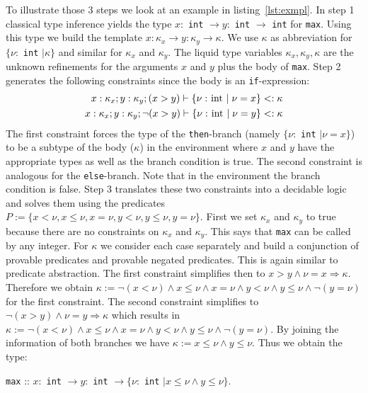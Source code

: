 \documentclass[a4paper,UKenglish]{lipics-v2016}
\begin{document}
To illustrate those 3 steps we look at an example in listing~\ref{lst:exmpl}.
In step 1 classical type inference yields the type $x:$ \lstinline{int} $\rightarrow y:$ \lstinline{int} $\rightarrow$ \lstinline{int} for \lstinline{max}.
Using this type we build the template $x: \kappa_x \rightarrow y: \kappa_y \rightarrow \kappa$.
We use $\kappa$ as abbreviation for $\{ \nu:$ \lstinline{int} $\mid \kappa\}$ and similar for $\kappa_x$ and $\kappa_y$.
The liquid type variables $\kappa_x, \kappa_y, \kappa$ are the unknown refinements for the arguments $x$ and $y$ plus the body of \lstinline{max}.
Step 2 generates the following constraints since the body is an \lstinline{if}-expression:
\begin{align}
    \label{algn:max}
    x: \kappa_x; y: \kappa_y; (x > y) \vdash \{\nu: \text{\lstinline|int|} \mid \nu = x \} <: \kappa\\
    x: \kappa_x; y: \kappa_y; \neg(x > y) \vdash \{\nu: \text{\lstinline|int|} \mid \nu = y \} <: \kappa
\end{align}
The first constraint forces the type of the \lstinline{then}-branch (namely $\{\nu:$ \lstinline{int} $\mid \nu = x \}$) to be a subtype
of the body ($\kappa$) in the environment where $x$ and $y$ have the appropriate types as well as the branch condition is true.
The second constraint is analogous for the \lstinline{else}-branch.
Note that in the environment the branch condition is false.
Step 3 translates these two constraints into a decidable logic and solves them using the predicates $P := \{x < \nu, x \le \nu, x = \nu, y < \nu, y \le \nu, y = \nu\}$.
First we set $\kappa_x$ and $\kappa_y$ to true because there are no constraints on $\kappa_x$ and $\kappa_y$.
This says that \lstinline{max} can be called by any integer.
For $\kappa$ we consider each case separately and build a conjunction of provable predicates and provable negated predicates.
This is again similar to predicate abstraction.
The first constraint simplifies then to $x > y \land \nu = x \Rightarrow \kappa$.
Therefore we obtain $\kappa := \neg(x < \nu) \land x \le \nu \land x = \nu \land y < \nu \land y \le \nu \land \neg(y = \nu)$ for the first constraint.
The second constraint simplifies to $\neg(x > y) \land \nu = y \Rightarrow \kappa$
which results in $\kappa := \neg(x < \nu) \land x \le \nu \land x = \nu \land y < \nu \land y \le \nu \land \neg(y = \nu)$.
By joining the information of both branches we have $\kappa := x \le \nu \land y \le \nu$.
Thus we obtain the type:
\begin{center}
    \lstinline{max} :: $x:$ \lstinline{int} $\rightarrow y:$ \lstinline{int} $\rightarrow \{\nu:$ \lstinline{int} $\mid x \le \nu \land y \le \nu\}$.
\end{center}
\end{document}
